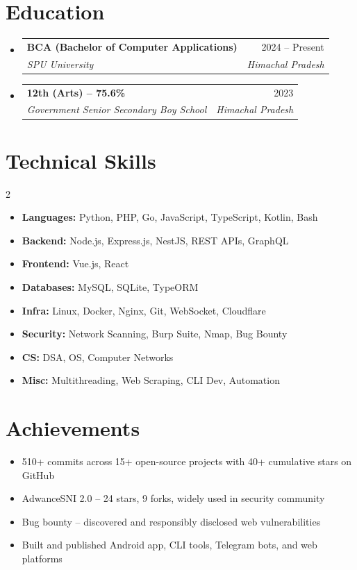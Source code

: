 \documentclass[letterpaper,11pt]{article}
\makeatletter
\newcommand{\resumeItem}[1]{
  \item\small{{#1 \vspace{-2pt}}}
}
\newcommand{\resumeSubheading}[4]{
  \vspace{-2pt}\item
    \begin{tabular*}{0.97\textwidth}[t]{l@{\extracolsep{\fill}}r}
      \textbf{#1} & #2 \\
      \textit{\small#3} & \textit{\small #4} \\
    \end{tabular*}\vspace{-7pt}
}
\newcommand{\resumeSubHeadingListStart}{\begin{itemize}[leftmargin=0.15in, label={}]}
\newcommand{\resumeSubHeadingListEnd}{\end{itemize}}
\makeatother
\begin{document}
\section{Education}
\resumeSubHeadingListStart
  \resumeSubheading
    {BCA (Bachelor of Computer Applications)}{2024 -- Present}
    {SPU University}{Himachal Pradesh}
  \resumeSubheading
    {12th (Arts) -- 75.6\%}{2023}
    {Government Senior Secondary Boy School}{Himachal Pradesh}
\resumeSubHeadingListEnd

\section{Technical Skills}
\begin{multicols}{2}
\resumeSubHeadingListStart
  \item{\textbf{Languages:} Python, PHP, Go, JavaScript, TypeScript, Kotlin, Bash}
  \item{\textbf{Backend:} Node.js, Express.js, NestJS, REST APIs, GraphQL}
  \item{\textbf{Frontend:} Vue.js, React}
  \item{\textbf{Databases:} MySQL, SQLite, TypeORM}
  \item{\textbf{Infra:} Linux, Docker, Nginx, Git, WebSocket, Cloudflare}
  \item{\textbf{Security:} Network Scanning, Burp Suite, Nmap, Bug Bounty}
  \item{\textbf{CS:} DSA, OS, Computer Networks}
  \item{\textbf{Misc:} Multithreading, Web Scraping, CLI Dev, Automation}
\resumeSubHeadingListEnd
\end{multicols}

\section{Achievements}
\resumeSubHeadingListStart
  \resumeItem{510+ commits across 15+ open-source projects with 40+ cumulative stars on GitHub}
  \resumeItem{AdwanceSNI 2.0 -- 24 stars, 9 forks, widely used in security community}
  \resumeItem{Bug bounty -- discovered and responsibly disclosed web vulnerabilities}
  \resumeItem{Built and published Android app, CLI tools, Telegram bots, and web platforms}
\resumeSubHeadingListEnd
\end{document}
